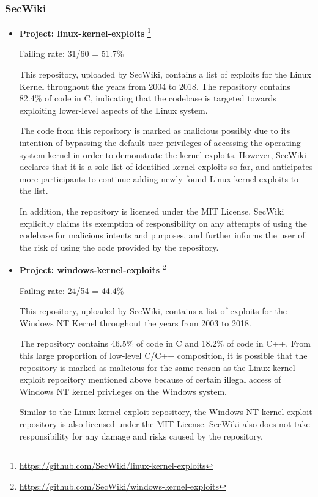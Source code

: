 \documentclass[]{acmart}
\begin{document}
\subsubsection{SecWiki}
\begin{itemize}
    \item { \bf Project: linux-kernel-exploits }\footnote{\url{https://github.com/SecWiki/linux-kernel-exploits}}

    Failing rate: 31/60 = 51.7\%

    This repository, uploaded by SecWiki, contains a list of exploits for the Linux Kernel throughout the years from 2004 to 2018. The repository contains 82.4\% of code in C, indicating that the codebase is targeted towards exploiting lower-level aspects of the Linux system. 

    The code from this repository is marked as malicious possibly due to its intention of bypassing the default user privileges of accessing the operating system kernel in order to demonstrate the kernel exploits. However, SecWiki declares that it is a sole list of identified kernel exploits so far, and anticipates more participants to continue adding newly found Linux kernel exploits to the list. 

    In addition, the repository is licensed under the MIT License. SecWiki explicitly claims its exemption of responsibility on any attempts of using the codebase for malicious intents and purposes, and further informs the user of the risk of using the code provided by the repository. \newline

    \item { \bf Project: windows-kernel-exploits }\footnote{\url{https://github.com/SecWiki/windows-kernel-exploits}}

    Failing rate: 24/54 = 44.4\%
    
    This repository, uploaded by SecWiki, contains a list of exploits for the Windows NT Kernel throughout the years from 2003 to 2018. 
    
    The repository contains 46.5\% of code in C and 18.2\% of code in C++. From this large proportion of low-level C/C++ composition, it is possible that the repository is marked as malicious for the same reason as the Linux kernel exploit repository mentioned above because of certain illegal access of Windows NT kernel privileges on the Windows system. 
    
    Similar to the Linux kernel exploit repository, the Windows NT kernel exploit repository is also licensed under the MIT License. SecWiki also does not take responsibility for any damage and risks caused by the repository. 
    
\end{itemize}
\end{document}

